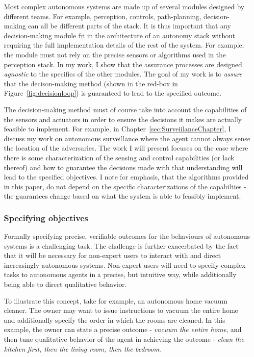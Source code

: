 Most complex autonomous systems are made up of several modules designed by different teams. For example, perception, controls, path-planning, decision-making can all be different parts of the stack. It is thus important that any decision-making module fit in the architecture of an autonomy stack without requiring the full implementation details of the rest of the system. For example, the module must not rely on the precise sensors or algorithms used in the perception stack. In my work, I show that the assurance processes are designed \emph{agnostic} to the specifics of the other modules. The goal of my work is to \emph{assure} that the decison-making method (shown in the red-box in Figure~\ref{fig:decisionloop}) is guaranteed to lead to the specified outcome.  

The decision-making method must of course take into account the capabilities of the sensors and actuators in order to ensure the decisions it makes are actually feasible to implement. For example, in Chapter~\ref{sec:SurveiilanceChapter}, I discuss my work on autonomous surveillance where the agent cannot always sense the location of the adversaries. The work I will present focuses on the case where there is some characterization of the sensing and control capabilities (or lack thereof) and how to guarantee the decisions made with that understanding will lead to the specified objectives. I note for emphasis, that the algorithms provided in this paper, do not depend on the specific characterizations of the capabilties - the guarantees change based on what the system is able to feasibly implement. 

\subsubsection{Specifying objectives}

Formally specifying precise, verifiable outcomes for the behaviours of autonomous systems is a challenging task. The challenge is further exacerbated by the fact that it will be necessary for non-expert users to interact with and direct increasingly autonomous systems. Non-expert users will need to specify complex tasks to autonomous agents in a precise, but intuitive way, while additionally being able to direct qualitative behavior. 

To illustrate this concept, take for example, an autonomous home vacuum cleaner. The owner may want to issue instructions to vacuum the entire home and additionally specify the order in which the rooms are cleaned. In this example, the owner can state a precise outcome - \emph{vacuum the entire home}, and then tune qualitative behavior of the agent in achieving the outcome - \emph{clean the kitchen first, then the living room, then the bedroom}. 

